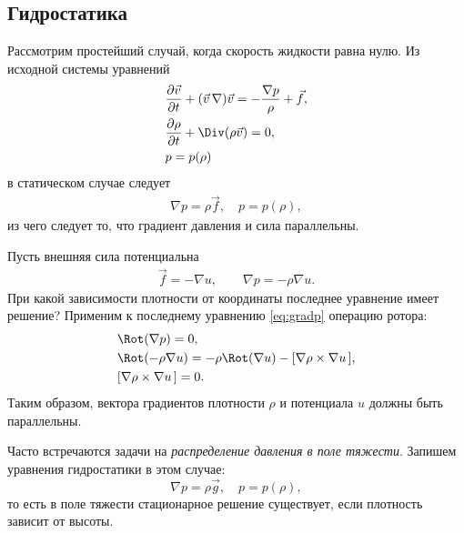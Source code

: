 \subsection{Гидростатика}
Рассмотрим простейший случай, когда скорость жидкости равна нулю. Из исходной системы уравнений
\begin{equation}\begin{aligned}
& \frac { \partial \vec{v} } { \partial t } + ( \vec{v}\,\nabla ) \vec{v} = - \frac { \nabla p } { \rho } + \vec { f }, \\
& \frac { \partial \rho } { \partial t } + \Div ( \rho \vec{v} ) = 0,\\
& p = p ( \rho )
\end{aligned}\end{equation}
в статическом случае следует
\begin{equation}\begin{aligned}
\nabla p = \rho \vec { f }, \quad
p = p ( \rho ),
\end{aligned}\end{equation}
из чего следует то, что градиент давления и сила параллельны.

Пусть внешняя сила потенциальна
\begin{equation}\begin{aligned}
\label{eq:gradp}
\vec { f } = - \nabla u, \qquad \nabla p = - \rho \nabla u.
\end{aligned}\end{equation}
При какой зависимости плотности от координаты последнее уравнение имеет решение? Применим к последнему уравнению \eqref{eq:gradp} операцию ротора:
\begin{equation}\begin{aligned}
&\Rot( \nabla p ) = 0, \\
&\Rot( - \rho \nabla u ) = - \rho\Rot( \nabla u ) - [ \nabla \rho \times \nabla u\,], \\
& [ \nabla \rho \times \nabla u\,] = 0.
\end{aligned}\end{equation}
Таким образом,  вектора градиентов плотности $\rho$ и потенциала $u$ должны быть параллельны.

Часто встречаются задачи на \textit{распределение давления в поле тяжести}. Запишем уравнения гидростатики в этом случае:
\begin{equation}
\nabla p = \rho \vec { g }, \quad p = p ( \rho ),
\end{equation}
то есть в поле тяжести стационарное решение существует, если плотность зависит от высоты.

